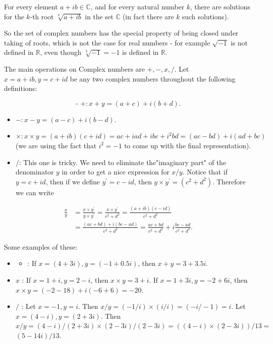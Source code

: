 For every element $a+i b \in \mathbb{C}$, and for every natural number $k$, there are solutions for the $k$-th root $\sqrt[k]{a+i b}$ in the set $\mathbb{C}$ (in fact there are $k$ such solutions).

So the set of complex numbers has the special property of being closed under taking of roots, which is not the case for real numbers - for example $\sqrt{-1}$ is not defined in $\mathbb{R}$, even though $\sqrt[3]{-1}=-1$ is defined in $\mathbb{R}$.

The main operations on Complex numbers are $+,-, x, /$. Let $x=a+i b, y=c+i d$ be any two complex numbers throughout the following definitions:

$$
\text { - }+: x+y=(a+c)+i(b+d) \text {. }
$$

\begin{itemize}
  \item $-: x-y=(a-c)+i(b-d)$.
  \item $\times: x \times y=(a+i b)(c+i d)=a c+i a d+i b c+i^{2} b d=(a c-b d)+i(a d+b c)$ (we are using the fact that $i^{2}=-1$ to come up with the final representation).
  \item /: This one is tricky. We need to eliminate the"imaginary part" of the denominator $y$ in order to get a nice expression for $x / y$. Notice that if $y=c+i d$, then if we define $y^{\prime}=c-i d$, then $y \times y^{\prime}=\left(c^{2}+d^{2}\right)$. Therefore we can write
\end{itemize}

$$
\begin{aligned}
\frac{x}{y} & =\frac{x \times y^{\prime}}{y \times y^{\prime}}=\frac{x \times y^{\prime}}{c^{2}+d^{2}}=\frac{(a+i b)(c-i d)}{c^{2}+d^{2}} \\
& =\frac{(a c+b d)+i(b c-a d)}{c^{2}+d^{2}}=\frac{a c+b d}{c^{2}+d^{2}}+i \frac{b c-a d}{c^{2}+d^{2}} .
\end{aligned}
$$

Some examples of these:

\begin{itemize}
  \item 
  \begin{itemize}
    \item : If $x=(4+3 i), y=(-1+0.5 i)$, then $x+y=3+3.5 i$.
  \end{itemize}
  \item $x$ : If $x=1+i, y=2-i$, then $x \times y=3+i$. If $x=1+3 i, y=-2+6 i$, then $x \times y=(-2-18)+i(-6+6)=-20$.
  \item $/$ : Let $x=-1, y=i$. Then $x / y=(-1 / i) \times(i / i)=(-i /-1)=i$. Let $x=(4-i), y=(2+3 i)$. Then $x / y=(4-i) /(2+3 i) \times(2-3 i) /(2-3 i)=((4-i) \times(2-3 i)) / 13=$ $(5-14 i) / 13$.
\end{itemize}

